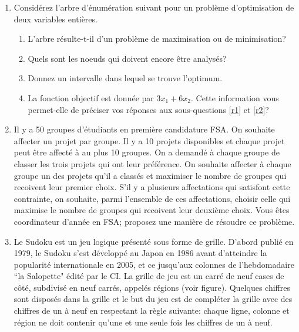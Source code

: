 \begin{enumerate}
  \item Considérez l'arbre d'énumération suivant pour un problème d'optimisation de deux variables entières.

    \begin{enumerate}
      \item L'arbre résulte-t-il d'un problème de maximisation ou de minimisation?
      \item \label{r1} Quels sont les
        noeuds qui doivent encore être analysés?
      \item \label{r2} Donnez un intervalle dans lequel se trouve
        l'optimum.
      \item La fonction objectif est donnée
        par $3x_1+6x_2$. Cette information vous permet-elle de préciser vos réponses aux sous-questions \ref{r1} et
        \ref{r2}?
    \end{enumerate}


    \begin{solution}
      \nosolution
    \end{solution}

  \item  Il y a 50 groupes d'étudiants en première candidature FSA. On souhaite affecter un projet par groupe. Il y a 10
    projets disponibles et chaque projet peut être affecté à au plus 10 groupes. On a demandé à chaque groupe de classer les trois projets qui ont leur
    préférence. On souhaite affecter à chaque groupe un des projets qu'il a classés et maximiser le nombre de groupes qui recoivent leur premier choix.
    S'il y a plusieurs affectations qui satisfont cette contrainte, on souhaite, parmi l'ensemble de ces affectations, choisir celle qui maximise le nombre de groupes
    qui recoivent leur deuxième choix. Vous êtes coordinateur d'année en FSA; proposez une manière de résoudre ce problème.


    \begin{solution}
      \nosolution
    \end{solution}

  \item Le Sudoku est un jeu logique présenté sous forme de grille. D'abord publié en 1979, le Sudoku s'est développé au Japon en 1986 avant d'atteindre la popularité internationale en 2005, et ce jusqu'aux colonnes de l'hebdomadaire ``la Salopette" édité par le CI. La grille de jeu est un carré de neuf cases de côté, subdivisé en neuf carrés, appelés régions (voir figure). Quelques chiffres sont disposés dans la grille et le but du jeu est de compléter la grille avec des chiffres  de un à neuf en respectant la règle suivante: chaque ligne, colonne et région ne doit contenir qu'une et une seule fois  les chiffres de un à neuf.


\end{enumerate}
